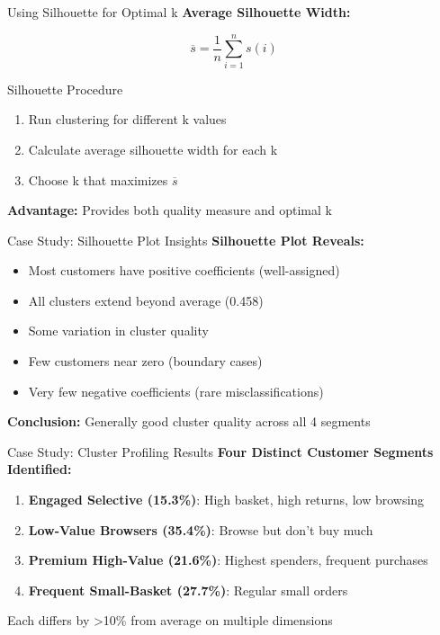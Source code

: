 \documentclass[aspectratio=169,ignorenonframetext]{beamer}
\begin{document}
\begin{frame}{Using Silhouette for Optimal k}
\textbf{Average Silhouette Width:}

\[\overline{s} = \frac{1}{n}\sum_{i = 1}^{n}s(i)\]
\end{frame}

\begin{frame}{Silhouette Procedure}
\begin{enumerate}
\item
  Run clustering for different k values
\item
  Calculate average silhouette width for each k
\item
  Choose k that maximizes \(\overline{s}\)
\end{enumerate}

\textbf{Advantage:} Provides both quality measure and optimal k
\end{frame}

\begin{frame}{Case Study: Silhouette Plot Insights}
\textbf{Silhouette Plot Reveals:}

\begin{itemize}
\item
  Most customers have positive coefficients (well-assigned)
\item
  All clusters extend beyond average (0.458)
\item
  Some variation in cluster quality
\item
  Few customers near zero (boundary cases)
\item
  Very few negative coefficients (rare misclassifications)
\end{itemize}

\textbf{Conclusion:} Generally good cluster quality across all 4
segments
\end{frame}

\begin{frame}{Case Study: Cluster Profiling Results}
\textbf{Four Distinct Customer Segments Identified:}

\begin{enumerate}
\item
  \textbf{Engaged Selective (15.3\%)}: High basket, high returns, low
  browsing
\item
  \textbf{Low-Value Browsers (35.4\%)}: Browse but don't buy much
\item
  \textbf{Premium High-Value (21.6\%)}: Highest spenders, frequent
  purchases
\item
  \textbf{Frequent Small-Basket (27.7\%)}: Regular small orders
\end{enumerate}

Each differs by \textgreater10\% from average on multiple dimensions
\end{frame}
\end{document}
